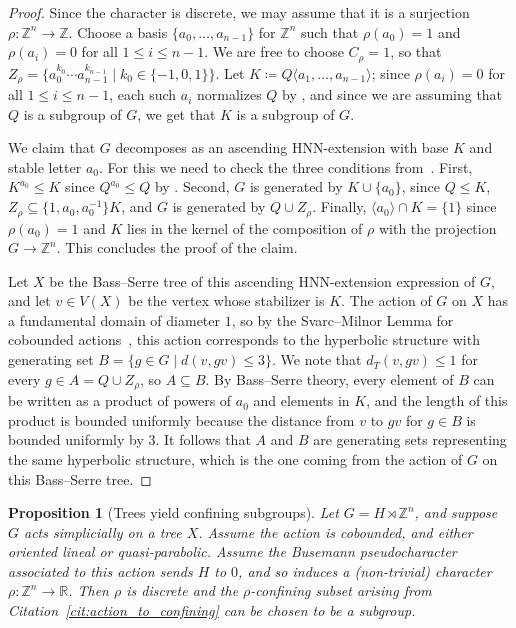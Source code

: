 \documentclass[10pt,a4paper]{article}
\newtheorem{prop}[cdrthm]{Proposition}
\theoremstyle{definition}
\theoremstyle{remark}
\newcommand{\Z}{\mathbb{Z}}
\newcommand{\R}{\mathbb{R}}
\theoremstyle{plain}
\begin{document}
\begin{proof}
Since the character is discrete, we may assume that it is a surjection $\rho \colon \Z^n \to \Z$. Choose a basis $\{a_0,\dots,a_{n-1}\}$ for $\Z^n$ such that $\rho(a_0)=1$ and $\rho(a_i)=0$ for all $1\le i\le n-1$. We are free to choose $C_\rho=1$, so that $Z_\rho=\{a_0^{k_0}\cdots a_{n-1}^{k_{n-1}}\mid k_0\in\{-1,0,1\}\}$. Let $K\coloneqq Q\langle a_1,\dots,a_{n-1}\rangle$; since $\rho(a_i)=0$ for all $1\le i\le n-1$, each such $a_i$ normalizes $Q$ by \StayInConf, and since we are assuming that $Q$ is a subgroup of $G$, we get that $K$ is a subgroup of $G$.

We claim that $G$ decomposes as an ascending HNN-extension with base $K$ and stable letter $a_0$. For this we need to check the three conditions from~\cite[Lemma~3.1]{ascending}. First, $K^{a_0}\le K$ since $Q^{a_0}\le Q$ by \StayInConf. Second, $G$ is generated by $K\cup\{a_0\}$, since $Q\le K$, $Z_\rho\subseteq \{1,a_0,a_0^{-1}\}K$, and $G$ is generated by $Q\cup Z_\rho$. Finally, $\langle a_0\rangle\cap K=\{1\}$ since $\rho(a_0)=1$ and $K$ lies in the kernel of the composition of $\rho$ with the projection $G\to\Z^n$. This concludes the proof of the claim.

Let $X$ be the Bass--Serre tree of this ascending HNN-extension expression of $G$, and let $v \in V(X)$ be the vertex whose stabilizer is $K$. The action of $G$ on $X$ has a fundamental domain of diameter $1$, so by the Svarc--Milnor Lemma for cobounded actions~\cite[Lemma 3.11]{ABO}, this action corresponds to the hyperbolic structure with generating set
\(B = \{ g \in G \mid d(v, gv) \leq 3 \}.\)
We note that $d_T(v, gv) \leq 1$ for every $g \in A = Q \cup Z_\rho$, so $A \subseteq B$. By Bass--Serre theory, every element of $B$ can be written as a product of powers of $a_0$ and elements in $K$, and the length of this product is bounded uniformly because the distance from $v$ to $gv$ for $g\in B$ is bounded uniformly by $3$. It follows that $A$ and $B$ are generating sets representing the same hyperbolic structure, which is the one coming from the action of $G$ on this Bass--Serre tree.
\end{proof}

\begin{prop}[Trees yield confining subgroups] \label{prop:trees_to_subgroups}
Let $G=H\rtimes \Z^n$, and suppose $G$ acts simplicially on a tree $X$. Assume the action is cobounded, and either oriented lineal or quasi-parabolic. Assume the Busemann pseudocharacter associated to this action sends $H$ to $0$, and so induces a (non-trivial) character $\rho\colon \Z^n\to\R$. Then $\rho$ is discrete and the $\rho$-confining subset arising from Citation~\ref{cit:action_to_confining} can be chosen to be a subgroup.
\end{prop}
\end{document}
